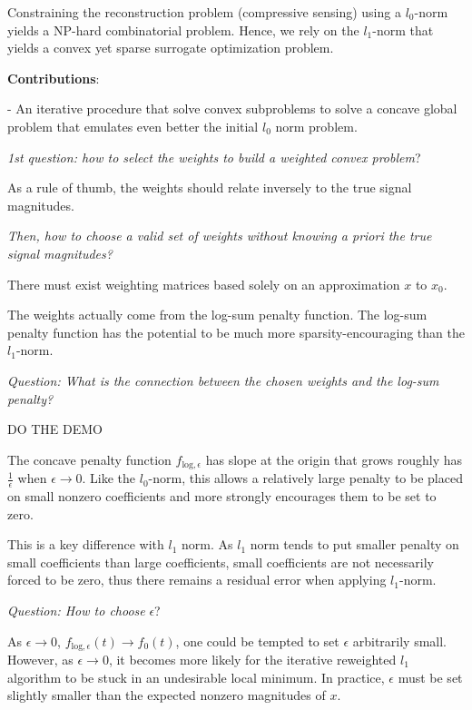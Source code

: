 \documentclass[a4paper,10pt]{article}
\theoremstyle{definition}
\begin{document}
\vskip 0.1in

Constraining the reconstruction problem (compressive sensing) using a $l_0$-norm yields a NP-hard combinatorial problem. Hence, we rely on the $l_1$-norm that yields a convex yet sparse surrogate optimization
problem.

\vskip 0.1in

\textbf{Contributions}:
\begin{list}{}{}
    \item - An iterative procedure that solve convex subproblems to solve a concave global problem that emulates even better the initial $l_0$ norm problem.
\end{list}

\vskip 0.1in

\textit{1st question: how to select the weights to build a weighted convex problem}?

As a rule of thumb, the weights should relate inversely to the true signal magnitudes.

\textit{Then, how to choose a valid set of weights without knowing a priori the true signal magnitudes?}


There must exist weighting matrices based solely on an approximation $x$ to $x_0$.

\vskip 0.1in

The weights actually come from the log-sum penalty function. The log-sum penalty function has the potential to be much more sparsity-encouraging than the $l_1$-norm.

\vskip 0.1in

\textit{Question: What is the connection between the chosen weights and the log-sum penalty?}

DO THE DEMO

\vskip 0.1in

The concave penalty function $f_{\text{log}, \epsilon}$ has slope at the origin that grows roughly has $\frac{1}{\epsilon}$ when $\epsilon \rightarrow 0$.
Like the $l_0$-norm, this allows a relatively large penalty to be placed on small nonzero coefficients and more strongly encourages them to be set to zero.

This is a key difference with $l_1$ norm. As $l_1$ norm tends to put smaller penalty on small coefficients than large coefficients, small coefficients are not
necessarily forced to be zero, thus there remains a residual error when applying $l_1$-norm.

\vskip 0.1in

\textit{Question: How to choose} $\epsilon$?

As $\epsilon \rightarrow 0$, $f_{\text{log}, \epsilon}(t) \rightarrow f_0(t)$, one could be tempted to set $\epsilon$ arbitrarily small. However, as $\epsilon \rightarrow 0$,
it becomes more likely for the iterative reweighted $l_1$ algorithm to be stuck in an undesirable local minimum.
In practice, $\epsilon$ must be set slightly smaller than the expected nonzero magnitudes of $x$.
\end{document}
